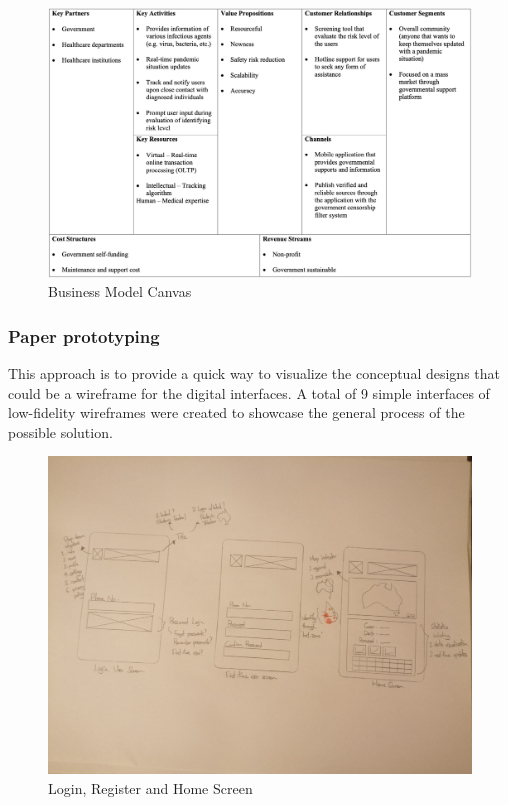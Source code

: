       \begin{figure}[H]
        \centering
        \includegraphics[width=\linewidth]{img/bmc.png}
        \caption{Business Model Canvas}
        \label{fig:bmc}
      \end{figure}
    
    \subsubsection{Paper prototyping}
      \par This approach is to provide a quick way to visualize the conceptual designs that could be a wireframe for the digital interfaces. A total of 9 simple interfaces of low-fidelity wireframes were created to showcase the general process of the possible solution.
      \begin{figure}[H]
        \centering
        \includegraphics[width=\linewidth]{img/low-fidelity-prototype/sketch-1.png}
        \caption{Login, Register and Home Screen}
        \label{fig:prototype-01}
      \end{figure}
      
